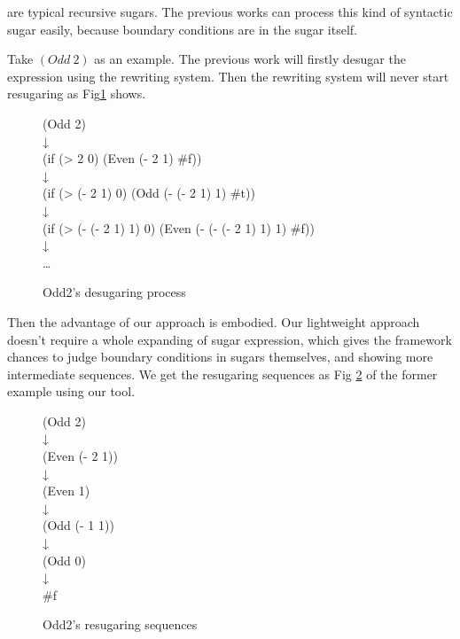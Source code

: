 are typical recursive sugars. The previous works can process this kind of syntactic sugar easily, because boundary conditions are in the sugar itself.

Take $(Odd~2)$ as an example. The previous work will firstly desugar the expression using the rewriting system. Then the rewriting system will never start resugaring as Fig\ref{fig:odd} shows.

\begin{figure}[ht]
	\centering
	\parbox[t]{\textwidth}{
				\begin{center}
				{
					\small\selectfont
					(Odd 2)\\
					↓\\
					(if (> 2 0) (Even (- 2 1) \#f))\\
					↓\\
					(if (> (- 2 1) 0) (Odd (- (- 2 1) 1) \#t))\\
					↓\\
					(if (> (- (- 2 1) 1) 0) (Even (- (- (- 2 1) 1) 1) \#f))\\
					↓\\
					{\ldots}
				}
				\end{center}
				
			}
	\caption{Odd2's desugaring process}
\label{fig:odd}
\end{figure}

Then the advantage of our approach is embodied. Our lightweight approach doesn't require a whole expanding of sugar expression, which gives the framework chances to judge boundary conditions in sugars themselves, and showing more intermediate sequences. We get the resugaring sequences as Fig \ref{fig:rec} of the former example using our tool.

\begin{figure}[ht]
	\centering
	\parbox[t]{\textwidth}{
				\begin{center}
				{
					\small\selectfont
					(Odd 2)\\
					↓\\
					(Even (- 2 1))\\
					↓\\
					(Even 1)\\
					↓\\
					(Odd (- 1 1))\\
					↓\\
					(Odd 0)\\
					↓\\
					\#f
				}
				\end{center}
				
			}
	\caption{Odd2's resugaring sequences}
\label{fig:rec}
\end{figure}

